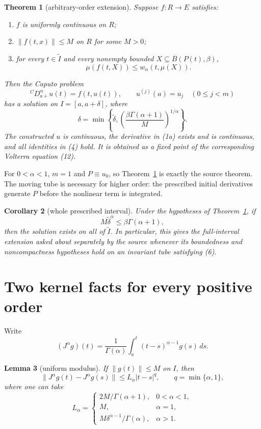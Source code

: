 \documentclass[11pt]{article}
\newtheorem{theorem}{Theorem}
\newtheorem{lemma}[theorem]{Lemma}
\newtheorem{corollary}[theorem]{Corollary}
\newcommand{\B}{\overline B}
\newcommand{\Ga}{\Gamma}
\begin{document}
\begin{theorem}[arbitrary-order extension]\label{thm:main}
Suppose $f:R\to E$ satisfies:
\begin{enumerate}
\item $f$ is uniformly continuous on $R$;
\item $\|f(t,x)\|\leq M$ on $R$ for some $M>0$;
\item for every $t\in\widetilde I$ and every nonempty bounded
      $X\subseteq\B(P(t),\beta)$,
\[
 \mu(f(t,X))\leq w_\alpha(t,\mu(X)).                         \tag{3}
\]
\end{enumerate}
Then the Caputo problem
\[
 {}^CD_{a+}^{\alpha}u(t)=f(t,u(t)),\qquad
 u^{(j)}(a)=u_j\quad(0\leq j<m)                              \tag{4}
\]
has a solution on $I=[a,a+\delta]$, where
\[
 \boxed{\ \delta=\min\left\{\widetilde\delta,
 \left(\frac{\beta\Ga(\alpha+1)}{M}\right)^{1/\alpha}
 \right\}.\ }                                               \tag{5}
\]
The constructed $u$ is continuous, the derivative in (1a) exists and is
continuous, and all identities in (4) hold.  It is obtained as a fixed point
of the corresponding Volterra equation (12).
\end{theorem}

For $0<\alpha<1$, $m=1$ and $P\equiv u_0$, so Theorem~\ref{thm:main} is
exactly the source theorem.  The moving tube is necessary for higher order:
the prescribed initial derivatives generate $P$ before the nonlinear term is
integrated.

\begin{corollary}[whole prescribed interval]\label{cor:global}
Under the hypotheses of Theorem~\ref{thm:main}, if
\[
 M\widetilde\delta^\alpha\leq\beta\Ga(\alpha+1),             \tag{6}
\]
then the solution exists on all of $\widetilde I$.  In particular, this gives
the full-interval extension asked about separately by the source whenever its
boundedness and noncompactness hypotheses hold on an invariant tube satisfying
(6).
\end{corollary}

\section{Two kernel facts for every positive order}

Write
\[
 (J^\alpha g)(t)=\frac1{\Ga(\alpha)}
 \int_a^t(t-s)^{\alpha-1}g(s)\,ds.                           \tag{7}
\]

\begin{lemma}[uniform modulus]\label{lem:mod}
If $\|g(t)\|\leq M$ on $I$, then
\[
 \|J^\alpha g(t)-J^\alpha g(s)\|\leq L_\alpha|t-s|^q,
 \qquad q=\min\{\alpha,1\},                                \tag{8}
\]
where one can take
\[
 L_\alpha=\begin{cases}
 2M/\Ga(\alpha+1),&0<\alpha<1,\\
 M,&\alpha=1,\\
 M\delta^{\alpha-1}/\Ga(\alpha),&\alpha>1.
 \end{cases}                                                  \tag{9}
\]
\end{lemma}
\end{document}
